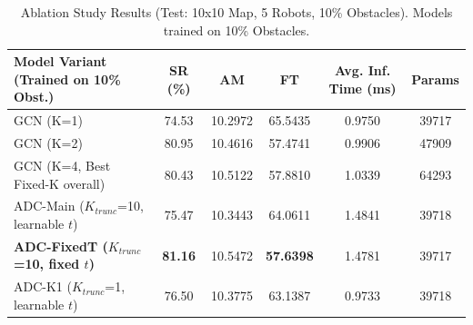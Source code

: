 \begin{table}[htbp]
    \centering
    \caption{Ablation Study Results (Test: 10x10 Map, 5 Robots, 10\% Obstacles). Models trained on 10\% Obstacles.}
    \label{tab:ablation}
    \scriptsize
    \begin{tabular}{lccccc}
        \toprule
        Model Variant (Trained on 10\% Obst.) & SR (\%) & AM & FT & Avg. Inf. Time (ms) & Params \\
        \midrule
        GCN (K=1) & 74.53 & 10.2972 & 65.5435 & 0.9750 & 39717 \\
        GCN (K=2) & 80.95 & 10.4616 & 57.4741 & 0.9906 & 47909 \\
        GCN (K=4, Best Fixed-K overall) & 80.43 & 10.5122 & 57.8810 & 1.0339 & 64293 \\
        \midrule
        ADC-Main ($K_{trunc}$=10, learnable $t$) & 75.47 & 10.3443 & 64.0611 & 1.4841 & 39718 \\
        \textbf{ADC-FixedT ($K_{trunc}$=10, fixed $t$)} & \textbf{81.16} & 10.5472 & \textbf{57.6398} & 1.4781 & 39717 \\
        ADC-K1 ($K_{trunc}$=1, learnable $t$) & 76.50 & 10.3775 & 63.1387 & 0.9733 & 39718 \\
        \bottomrule
    \end{tabular}
\end{table}

